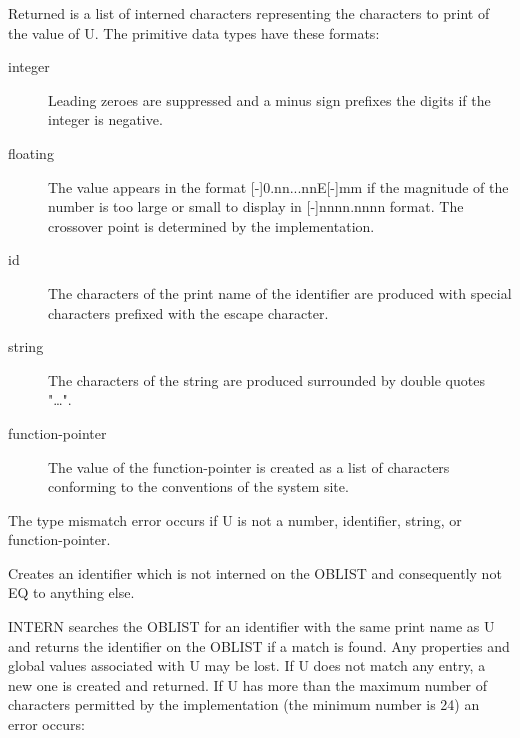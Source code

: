 \documentclass[11pt,letterpaper]{book}
\begin{document}
{Returned is a list of interned characters representing the characters
to print of the value of U. The primitive data types have these
formats:

\begin{description}
\item[integer]  Leading zeroes are suppressed and
a minus sign prefixes the digits if the integer is negative.

\item[floating]  The value appears in the format
[-]0.nn...nnE[-]mm if the magnitude of the number is too large or
small to display in [-]nnnn.nnnn format. The crossover point is
determined by the implementation.

\item[id]  The characters of the print name of the
identifier are produced with special characters prefixed with the
escape character.

\item[string]  The characters of the string are
produced surrounded by double quotes "\ldots".

\item[function-pointer]  The value of the
function-pointer is created as a list of characters conforming to the
conventions of the system site.
\end{description}

The type mismatch error occurs if U is not a number, identifier,
string, or function-pointer. }


{Creates an identifier which is not interned on the OBLIST and
consequently not EQ to anything else.  }


{INTERN searches the OBLIST for an identifier with the same print name
as U and returns the identifier on the OBLIST if a match is found.
Any properties and global values associated with U may be lost. If U
does not match any entry, a new one is created and returned. If U has
more than the maximum number of characters permitted by the
implementation (the minimum number is 24) an error occurs:

}
\end{document}
